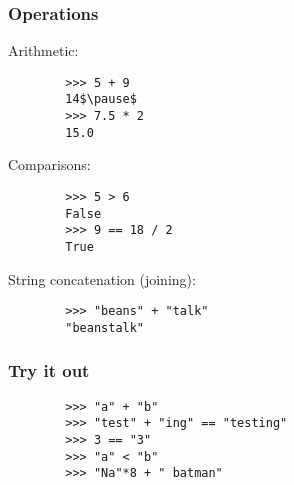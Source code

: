 \documentclass[notes]{beamer}
\begin{document}
\begin{frame}[fragile]
\begin{itemize}
			
			
			
		\end{itemize}
	\end{frame}
	
	\begin{frame}[fragile]
		\frametitle{Operations}
		
		Arithmetic:
		
		\begin{lstlisting}
		>>> 5 + 9
		14$\pause$
		>>> 7.5 * 2
		15.0
		\end{lstlisting}
		
		\pause
		
		Comparisons:
		
		\begin{lstlisting}
		>>> 5 > 6
		False
		>>> 9 == 18 / 2
		True
		\end{lstlisting}
		
		\pause
		
		String concatenation (joining):
		
		\begin{lstlisting}
		>>> "beans" + "talk"
		"beanstalk"
		\end{lstlisting}
	\end{frame}
	
	\begin{frame}[fragile]
		\frametitle{Try it out}
		
		\begin{lstlisting}
		>>> "a" + "b"
		>>> "test" + "ing" == "testing"
		>>> 3 == "3"
		>>> "a" < "b"
		>>> "Na"*8 + " batman"
		\end{lstlisting}
	\end{frame}
\end{document}
